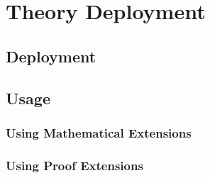 \section{Theory Deployment}
\subsection{Deployment}
\subsection{Usage}
\subsubsection{Using Mathematical Extensions}
\subsubsection{Using Proof Extensions}